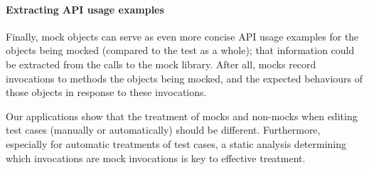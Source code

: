 \paragraph{Extracting API usage examples}
Finally, mock objects can serve as even more concise API usage
examples for the objects being mocked (compared to the test as a whole);
that information could be extracted from the calls to
the mock library. After all, mocks record invocations to methods the objects
being mocked, and the expected behaviours of those objects in response to
these invocations.

Our applications show that the treatment of mocks and non-mocks
when editing test cases (manually or automatically) should be different.
Furthermore, especially for automatic treatments of test cases, a static
analysis determining which invocations are mock invocations is key to effective
treatment.

